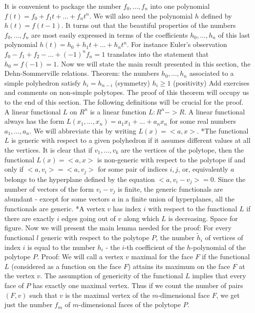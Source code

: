 It is convenient to package the number $f_0,...,f_n$ into one polynomial $f(t)=f_0+f_1 t+ ... + f_n t^n$. We will also need the polynomial $h$ defined by $h(t)=f(t-1)$.
It turns out that the beautiful properties of the numbers $f_0,...,f_n$ are most easily expressed in terms of the coefficients $h_0,...,h_n$ of this last polynomial $h(t)=h_0+h_1 t+...+h_n t^n$. For instance Euler's observation $f_0-f_1+f_2-...+(-1)^n f_n=1$ translates into the statement that $h_0=f(-1)=1$.
Now we will state the main result presented in this section, the Dehn-Sommerville relations.
Theorem: the numbers $h_0,...,h_n$ associated to a simple polyhedron satisfy
$h_i=h_{n-i}$ (symmetry)
$h_i\ge 1$ (positivity)
Add exercises and comments on non-simple polytopes.
The proof of this theorem will occupy us to the end of this section.
The following definitions will be crucial for the proof.
A linear functional $L$ on $R^n$ is a linear function $L:R^n->R$. A linear functional always has the form $L(x_1,...,x_n)=a_1 x_1+...+a_n x_n$ for some real numbers $a_1,...,a_n$. We will abbreviate this by writing $L(x)=<a,x>$.
*The functional $L$ is generic with respect to a given polyhedron if it assumes different values at all the vertices.
It is clear that if $v_1,...,v_k$ are the vertices of the polytope, then the functional $L(x)=<a,x>$ is non-generic with respect to the polytope if and only if $<a,v_i>=<a,v_j>$ for some pair of indices $i,j$, or, equivalently $a$ belongs to the hyperplane defined by the equation $<a,v_i-v_j>=0$. Since the number of vectors of the form $v_i-v_j$ is finite, the generic functionals are abundant - except for some vectors $a$ in a finite union of hyperplanes, all the functionals are generic.
*A vertex $v$ has index $i$ with respect to the functional $L$ if there are exactly $i$ edges going out of $v$ along which $L$ is decreasing.
Space for figure.
Now we will present the main lemma needed for the proof:
For every functional $l$ generic with respect to the polytope $P$, the number $\tilde{h}_i$ of vertices of index $i$ is equal to the number $h_i$ - the $i$-th coefficient of the $h$-polynomial of the polytope $P$.
Proof: We will call a vertex $v$ maximal for the face $F$ if the functional $L$ (considered as a function on the face $F$) attains its maximum on the face $F$ at the vertex $v$. The assumption of genericity of the functional $L$ implies that every face of $P$ has exactly one maximal vertex.
Thus if we count the number of pairs $(F,v)$ such that $v$ is the maximal vertex of the $m$-dimensional face $F$, we get just the number $f_m$ of $m$-dimensional faces of the polytope $P$.
